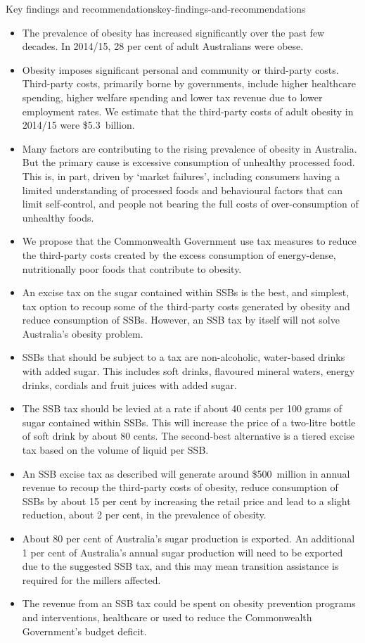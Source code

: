 \documentclass[embargoed]{grattan}
\begin{document}
\begin{bigbox*}{Key findings and recommendations}{key-findings-and-recommendations}

\begin{itemize}
\item
  The prevalence of obesity has increased significantly over the past few decades.
In 2014/15, 28 per cent of adult Australians were obese.
\item
  Obesity imposes significant personal and community or third-party costs.
Third-party costs, primarily borne by governments, include higher healthcare spending, higher welfare spending and lower tax revenue due to lower employment rates.
We estimate that the third-party costs of adult obesity in 2014/15 were \$5.3~billion.
\item
  Many factors are contributing to the rising prevalence of obesity in Australia.
But the primary cause is excessive consumption of unhealthy processed food.
This is, in part, driven by `market failures', including consumers having a limited understanding of processed foods and behavioural factors that can limit self-control, and people not bearing the full costs of over-consumption of unhealthy foods.
\item
  We propose that the Commonwealth Government use tax measures to reduce the third-party costs created by the excess consumption of energy-dense, nutritionally poor foods that contribute to obesity.
\item
  An excise tax on the sugar contained within SSBs is the best, and simplest, tax option to recoup some of the third-party costs generated by obesity and reduce consumption of SSBs.
However, an SSB tax by itself will not solve Australia's obesity problem.
\item
  SSBs that should be subject to a tax are non-alcoholic, water-based drinks with added sugar.
This includes soft drinks, flavoured mineral waters, energy drinks, cordials and fruit juices with added sugar.
\item
  The SSB tax should be levied at a rate if about 40 cents per 100 grams of sugar contained within SSBs.
This will increase the price of a two-litre bottle of soft drink by about 80 cents. The second-best alternative is a tiered excise tax based on the volume of liquid per SSB.
\item
  An SSB excise tax as described will generate around \$500~million in annual revenue to recoup the third-party costs of obesity, reduce consumption of SSBs by about 15 per cent by increasing the retail price and lead to a slight reduction, about 2 per cent, in the prevalence of obesity.
\item
   About 80 per cent of Australia's sugar production is exported.
An additional 1 per cent of Australia's annual sugar production will need to be exported due to the suggested SSB tax, and this may mean transition assistance is required for the millers affected.
\item
  The revenue from an SSB tax could be spent on obesity prevention programs and interventions, healthcare or used to reduce the Commonwealth Government's budget deficit.
\end{itemize}
\end{bigbox*}
\end{document}
